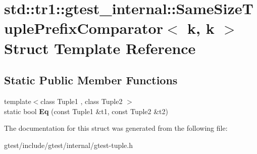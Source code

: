 \hypertarget{structstd_1_1tr1_1_1gtest__internal_1_1SameSizeTuplePrefixComparator_3_01k_00_01k_01_4}{}\section{std\+:\+:tr1\+:\+:gtest\+\_\+internal\+:\+:Same\+Size\+Tuple\+Prefix\+Comparator$<$ k, k $>$ Struct Template Reference}
\label{structstd_1_1tr1_1_1gtest__internal_1_1SameSizeTuplePrefixComparator_3_01k_00_01k_01_4}
\subsection*{Static Public Member Functions}
\begin{DoxyCompactItemize}
\item 
\mbox{\label{structstd_1_1tr1_1_1gtest__internal_1_1SameSizeTuplePrefixComparator_3_01k_00_01k_01_4_a5564fbade05a2d0522d9899da62c2119}} 
{\footnotesize template$<$class Tuple1 , class Tuple2 $>$ }\\static bool {\bfseries Eq} (const Tuple1 \&t1, const Tuple2 \&t2)
\end{DoxyCompactItemize}


The documentation for this struct was generated from the following file\+:\begin{DoxyCompactItemize}
\item 
gtest/include/gtest/internal/gtest-\/tuple.\+h\end{DoxyCompactItemize}

